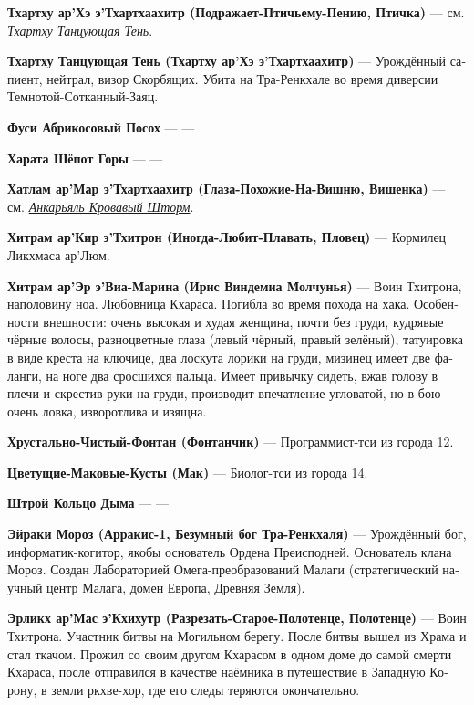 \documentclass[a4paper,12pt,fleqn]{book}\usepackage{polyglossia}\setdefaultlanguage[babelshorthands=true]{russian}\setotherlanguage{english}\defaultfontfeatures{Ligatures=TeX,Mapping=tex-text}\usepackage{xcolor}\newcommand{\ml}[3]{#2}
\newcommand{\theterm}[3]{\textbf{\hypertarget{#1}{#2}} --- #3}
\newcommand{\thesynonim}[3]{\textbf{#2} --- см. \textit{\hyperlink{#1}{#3}}.}
\begin{document}
{\thesynonim{dancing-shadow}
{Тхартху ар’Хэ э’Тхартхаахитр (Подражает-Птичьему-Пению, Птичка)}
{Тхартху Танцующая Тень}

\theterm{dancing-shadow}
{Тхартху Танцующая Тень (Тхартху ар’Хэ э’Тхартхаахитр)}
{Урождённый сапиент, нейтрал, визор Скорбящих.
Убита на Тра-Ренкхале во время диверсии Темнотой-Сотканный-Заяц.}

\theterm{fuxi}
{Фуси Абрикосовый Посох}
{---}

\theterm{jarata}
{Харата Шёпот Горы}
{---}

\thesynonim{ancarjal}
{Хатлам ар’Мар э’Тхартхаахитр (Глаза-Похожие-На-Вишню, Вишенка)}
{Анкарьяль Кровавый Шторм}

\theterm{nurse-chitram}
{Хитрам ар’Кир э’Тхитрон (Иногда-Любит-Плавать, Пловец)}
{Кормилец Ликхмаса ар'Люм.}

\theterm{chitram-warrior}
{Хитрам ар'Эр э'Виа-Марина (Ирис Виндемиа Молчунья)}
{Воин Тхитрона, наполовину ноа.
Любовница Кхараса.
Погибла во время похода на хака.
Особенности внешности: очень высокая и худая женщина, почти без груди, кудрявые чёрные волосы, разноцветные глаза (левый чёрный, правый зелёный), татуировка в виде креста на ключице, два лоскута лорики на груди, мизинец имеет две фаланги, на ноге два сросшихся пальца.
Имеет привычку сидеть, вжав голову в плечи и скрестив руки на груди, производит впечатление угловатой, но в бою очень ловка, изворотлива и изящна.}

\theterm{fountain} %
{Хрустально-Чистый-Фонтан (Фонтанчик)}
{Программист-тси из города 12.}

\theterm{blooming-poppy-bush}
{Цветущие-Маковые-Кусты (Мак)}
{Биолог-тси из города 14.}

\theterm{stroji} %
{Штрой Кольцо Дыма}
{---}

\theterm{ejraci} %
{Эйраки Мороз (Арракис-1, Безумный бог Тра-Ренкхаля)}
{Урождённый бог, информатик-когитор, якобы основатель Ордена Преисподней.
Основатель клана Мороз.
Создан Лабораторией Омега-преобразований Малаги (стратегический научный центр Малага, домен Европа, Древняя Земля).}

\theterm{oerlikch}
{Эрликх ар'Мас э'Кхихутр (Разрезать-Старое-Полотенце, Полотенце)}
{Воин Тхитрона.
Участник битвы на Могильном берегу.
После битвы вышел из Храма и стал ткачом.
Прожил со своим другом Кхарасом в одном доме до самой смерти Кхараса, после отправился в качестве наёмника в путешествие в Западную Корону, в земли ркхве-хор, где его следы теряются окончательно.}

}
\end{document}
